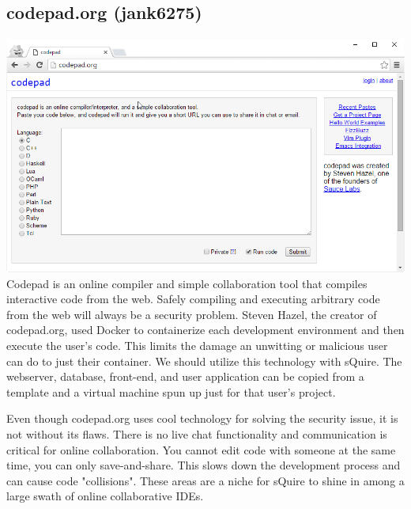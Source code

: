 \documentclass[11pt]{report}
\begin{document}
\subsection{codepad.org (jank6275)}
\includegraphics[width=\textwidth]{codepad}
Codepad is an online compiler and simple collaboration tool that compiles interactive code from the web. Safely compiling and executing arbitrary code from the web will always be a security problem. Steven Hazel, the creator of codepad.org, used Docker to containerize each development environment and then execute the user’s code. This limits the damage an unwitting or malicious user can do to just their container. We should utilize this technology with sQuire. The webserver, database, front-end, and user application can be copied from a template and a virtual machine spun up just for that user’s project.


Even though codepad.org uses cool technology for solving the security issue, it is not without its flaws. There is no live chat functionality and communication is critical for online collaboration. You cannot edit code with someone at the same time, you can only save-and-share. This slows down the development process and can cause code "collisions". These areas are a niche for sQuire to shine in among a large swath of online collaborative IDEs.
\end{document}
